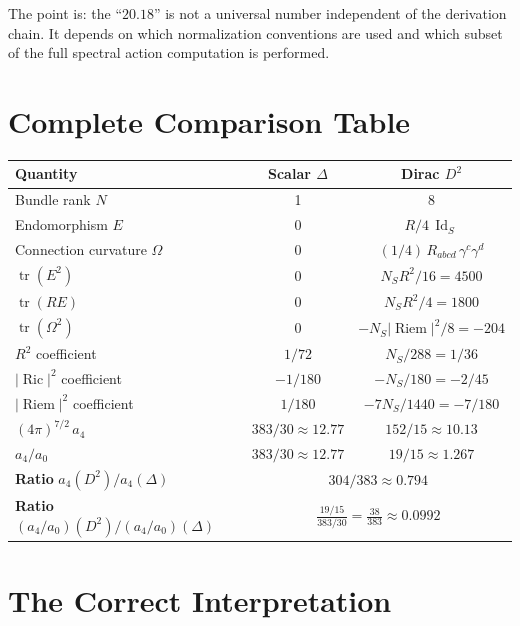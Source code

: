 \documentclass[12pt,a4paper]{article}
\theoremstyle{definition}
\DeclareMathOperator{\tr}{tr}
\DeclareMathOperator{\Ric}{Ric}
\DeclareMathOperator{\Riem}{Riem}
\DeclareMathOperator{\Id}{Id}
\begin{document}
The point is: the ``$20.18$'' is not a universal number independent
of the derivation chain.  It depends on which normalization
conventions are used and which subset of the full spectral action
computation is performed.


\section{Complete Comparison Table}
\label{sec:table}

\begin{center}
\renewcommand{\arraystretch}{1.4}
\begin{tabular}{lcc}
\toprule
\textbf{Quantity} & \textbf{Scalar $\Delta$} & \textbf{Dirac $D^2$} \\
\midrule
Bundle rank $N$ & 1 & 8 \\
Endomorphism $E$ & 0 & $R/4\,\Id_S$ \\
Connection curvature $\Omega$ & 0 & $(1/4)\,R_{abcd}\,\gamma^c\gamma^d$ \\
$\tr(E^2)$ & 0 & $N_S R^2/16 = 4500$ \\
$\tr(RE)$ & 0 & $N_S R^2/4 = 1800$ \\
$\tr(\Omega^2)$ & 0 & $-N_S |\Riem|^2/8 = -204$ \\
\midrule
$R^2$ coefficient & $1/72$ & $N_S/288 = 1/36$ \\
$|\Ric|^2$ coefficient & $-1/180$ & $-N_S/180 = -2/45$ \\
$|\Riem|^2$ coefficient & $1/180$ & $-7N_S/1440 = -7/180$ \\
\midrule
$(4\pi)^{7/2}\,a_4$ & $383/30 \approx 12.77$ & $152/15 \approx 10.13$ \\
$a_4/a_0$ & $383/30 \approx 12.77$ & $19/15 \approx 1.267$ \\
\midrule
\textbf{Ratio} $a_4(D^2)/a_4(\Delta)$ & \multicolumn{2}{c}{$304/383 \approx 0.794$} \\
\textbf{Ratio} $(a_4/a_0)(D^2)/(a_4/a_0)(\Delta)$ & \multicolumn{2}{c}{$\frac{19/15}{383/30} = \frac{38}{383} \approx 0.0992$} \\
\bottomrule
\end{tabular}
\end{center}


\section{The Correct Interpretation}
\label{sec:interpretation}
\end{document}
